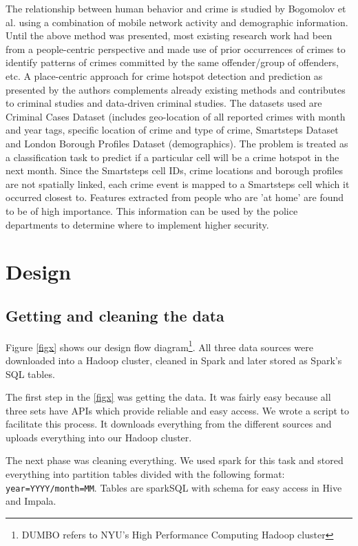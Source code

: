 \documentclass{sigkddExp}
\begin{document}
The relationship between human behavior and crime is studied by Bogomolov et al. \cite{OUAC} using a combination of mobile network activity and demographic information. Until the above method was presented, most existing research work had been from a people-centric perspective and made use of prior occurrences of crimes to identify patterns of crimes committed by the same offender/group of offenders, etc. A place-centric approach for crime hotspot detection and prediction as presented by the authors complements already existing methods and contributes to criminal studies and data-driven criminal studies. 
The datasets used are Criminal Cases Dataset (includes geo-location of all reported crimes with month and year tags, specific location of crime and type of crime, Smartsteps Dataset and London Borough Profiles Dataset (demographics). The problem is treated as a classification task to predict if a particular cell will be a crime hotspot in the next month. Since the Smartsteps cell IDs, crime locations and borough profiles are not spatially linked, each crime event is mapped to a Smartsteps cell which it occurred closest to.  
Features extracted from people who are 'at home' are found to be of high importance. This information can be used by the police departments to determine where to implement higher security.

\section{Design}
\subsection{Getting and cleaning the data}

Figure \ref{figx} shows our design flow diagram\footnote{DUMBO refers to NYU's High Performance Computing Hadoop cluster}. All three data sources were downloaded into a Hadoop cluster, cleaned in Spark and later stored as Spark's SQL tables. 

The first step in the \ref{figx} was getting the data. It was fairly easy because all three sets have APIs which provide reliable and easy access. 
We wrote a script to facilitate this process. It downloads everything from the different sources and uploads everything into our Hadoop cluster. 

The next phase was cleaning everything. We used spark for this task and stored everything into partition tables divided with the following format: \texttt{year=YYYY/month=MM}. Tables are  sparkSQL with schema for easy access in Hive and Impala.
\end{document}
